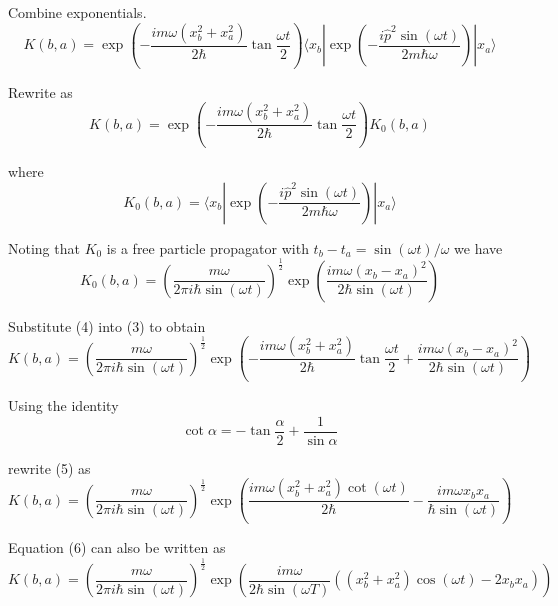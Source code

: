 Combine exponentials.
\begin{equation*}
K(b,a)=\exp\left(-\frac{im\omega(x_b^2+x_a^2)}{2\hbar}\tan\frac{\omega t}{2}\right)
\langle x_b|
\exp\left(-\frac{i\hat p^2\sin(\omega t)}{2m\hbar\omega}\right)
|x_a\rangle
\end{equation*}

Rewrite as
\begin{equation*}
K(b,a)=\exp\left(-\frac{im\omega(x_b^2+x_a^2)}{2\hbar}\tan\frac{\omega t}{2}\right)K_0(b,a)
\tag{3}
\end{equation*}

where
\begin{equation*}
K_0(b,a)=\langle x_b|\exp\left(-\frac{i\hat p^2\sin(\omega t)}{2m\hbar\omega}\right)|x_a\rangle
\end{equation*}

Noting that $K_0$ is a free particle propagator with $t_b-t_a=\sin(\omega t)/\omega$ we have
\begin{equation*}
K_0(b,a)=\left(\frac{m\omega}{2\pi i\hbar\sin(\omega t)}\right)^\frac{1}{2}
\exp\left(\frac{im\omega(x_b-x_a)^2}{2\hbar\sin(\omega t)}\right)
\tag{4}
\end{equation*}

Substitute (4) into (3) to obtain
\begin{equation*}
K(b,a)=\left(\frac{m\omega}{2\pi i\hbar\sin(\omega t)}\right)^\frac{1}{2}
\exp\left(-\frac{im\omega(x_b^2+x_a^2)}{2\hbar}\tan\frac{\omega t}{2}
+\frac{im\omega(x_b-x_a)^2}{2\hbar\sin(\omega t)}\right)
\tag{5}
\end{equation*}

Using the identity
\begin{equation*}
\cot\alpha=-\tan\frac{\alpha}{2}+\frac{1}{\sin\alpha}
\end{equation*}

rewrite (5) as
\begin{equation*}
K(b,a)=\left(\frac{m\omega}{2\pi i\hbar\sin(\omega t)}\right)^\frac{1}{2}
\exp\left(\frac{im\omega(x_b^2+x_a^2)\cot(\omega t)}{2\hbar}
-\frac{im\omega x_bx_a}{\hbar\sin(\omega t)}\right)
\tag{6}
\end{equation*}

Equation (6) can also be written as
\begin{equation*}
K(b,a)=\left(\frac{m\omega}{2\pi i\hbar\sin(\omega t)}\right)^\frac{1}{2}
\exp\left(\frac{im\omega}{2\hbar\sin(\omega T)}\left((x_b^2+x_a^2)\cos(\omega t)-2x_bx_a\right)\right)
\end{equation*}


